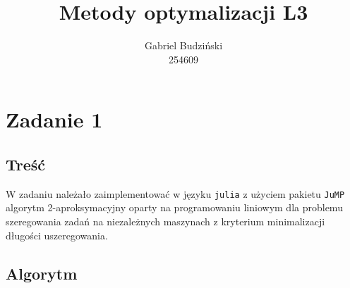 \documentclass{article}
\title{Metody optymalizacji L3}
\author{Gabriel Budziński\\254609}
\begin{document}
\maketitle

\section{Zadanie 1}

\subsection*{Treść}

W zadaniu należało zaimplementować w języku \texttt{julia} z użyciem pakietu \texttt{JuMP} algorytm 2-aproksymacyjny oparty na programowaniu liniowym dla problemu szeregowania zadań na niezależnych maszynach z kryterium minimalizacji długości uszeregowania.

\subsection*{Algorytm}
\end{document}

